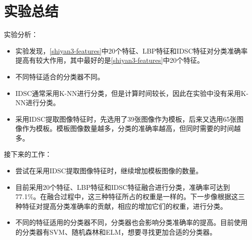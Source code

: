 \section{实验总结}
实验分析：
\begin{itemize}
\item 实验发现，\ref{shiyan3-features}中20个特征、LBP特征和IDSC特征对分类准确率提高有较大作用，其中最好的是\ref{shiyan3-features}中20个特征。
\item 不同特征适合的分类器不同。
\item IDSC通常采用K-NN进行分类，但是计算时间较长，因此在实验中没有采用K-NN进行分类。
\item 采用IDSC提取图像特征时，先选用了39张图像作为模板，后来又选用65张图像作为模板。模板图像数量越多，分类的准确率越高，但同时需要的时间越多。
\end{itemize}
接下来的工作：
\begin{itemize}
\item 尝试在采用IDSC提取图像特征时，继续增加模板图像的数量。
\item 目前采用20个特征、LBP特征和IDSC特征融合进行分类，准确率可达到77.1\%。在融合过程中，这三种特征所占的权重是一样的。下一步像根据这三种特征对提高分类准确率的贡献，相应的增加它们的权重，进行分类。
\item 不同的特征适用的分类器不同，分类器也会影响分类准确率的提高。目前使用的分类器有SVM、随机森林和ELM，想要寻找更加合适的分类器。
\end{itemize}

\begin{comment}
2015.9.15
\begin{itemize}
\item MATLAB进行实验的结果要比C的好，因此实验以MATLAB为主。
\item 在进行实验过程中，PKID中的特征只使用了13个（原来计划选用22个）。原因是由于图像质量原因，特征提取效果不是特别好，以至于一些特征对分类准确率的提升没有太大贡献。另外，还有两个特征我没有找到计算方法，但我感觉对实验结果提高不会有太大影响。
\item 实验中提取的特征不如PkID系统中的特征好（有一部分原因是实验中特征提取是对图像提取的，而图像质量又较低，导致提取的特征不准确。PkID系统中的基本特征都是从ZooProcess中得到的，能更好的反映浮游动物的特征），其分类的准确率也比PkID系统中的特征低2到3个百分点。
\item 因为需要使用的特征既有特征值，也有特征向量，这些特征直接一起使用会降低准确率，因此需要进行了特征融合（实验四、五）。目前采用了20个特征与LBP特征融合，分类的准确率有了一定的提高（达到76.1\%）。
\end{itemize}

接下来的工作：在特征融合的基础上继续进行实验，实验将不同形式的特征结合来得到更高的分类准确率。
\end{comment}